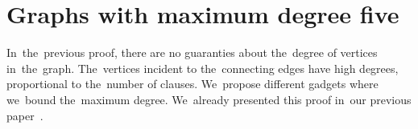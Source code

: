 \section{Graphs with maximum degree five}

In~the~previous proof, there are no guaranties about
the~degree of vertices in~the~graph. The~vertices incident to the~connecting edges
have high degrees, proportional to the~number of clauses.
We~propose different gadgets where we~bound the~maximum degree.
We~already presented this proof in~our previous paper~\cite{my_paper}.

%
%

